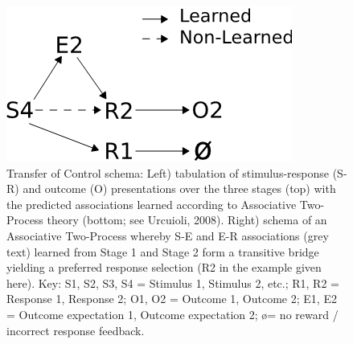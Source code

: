 \documentclass[]{elsarticle} %
\begin{document}
\begin{figure}
\begin{minipage}[t]{0.60\linewidth}
\end{minipage}
\hspace{0.2cm}
\begin{minipage}[t]{0.30\linewidth}
\vspace{-35pt}
\includegraphics[width=\textwidth]{figure1.png}
\end{minipage}
\caption{Transfer of Control schema: Left) tabulation of stimulus-response (S-R) and outcome (O) presentations over the three stages (top) with the predicted associations learned according to Associative Two-Process theory (bottom; see Urcuioli, 2008). Right) schema of an Associative Two-Process whereby S-E and E-R associations (grey text) learned from Stage 1 and Stage 2 form a transitive bridge yielding a preferred response selection (R2 in the example given here). Key: S1, S2, S3, S4 = Stimulus 1, Stimulus 2, etc.; R1, R2 = Response 1, Response 2; O1, O2 = Outcome 1, Outcome 2; E1, E2 = Outcome expectation 1, Outcome expectation 2; \o = no reward / incorrect response feedback.}
\label{fig:fig1}
\end{figure}
\end{document}
